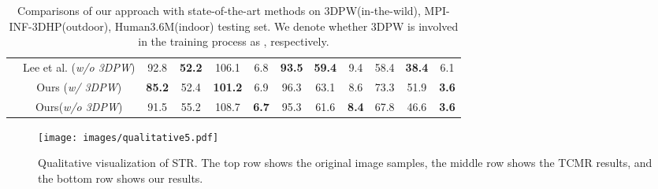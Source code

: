 \documentclass{bmvc2k}
\begin{document}
\begin{table*}[htb]
{\begin{tabular}{cc|cccc|ccc|ccc}
\cmidrule{2-12}          &Lee et al.  (\emph{w/o 3DPW}) \cite{Lee2021UncertaintyAwareHM}   &92.8       & \bfseries52.2      & 106.1      &6.8      &\bfseries93.5       &\bfseries59.4      & 9.4     &58.4     &\bfseries38.4      &6.1 \\

\cmidrule{2-12}          &Ours  (\emph{w/ 3DPW})    &\bfseries85.2       & 52.4      & \bfseries101.2      &6.9      &96.3       &63.1       & 8.6     &73.3     &51.9      &\bfseries3.6 \\

\cmidrule{2-12}          & Ours(\emph{w/o 3DPW})     & 91.5      & 55.2      & 108.7      & \bfseries6.7      & 95.3      & 61.6      & \bfseries8.4      & 67.8      & 46.6      & \bfseries3.6 \\
    \bottomrule
    \end{tabular}} 
    \caption{Comparisons of our approach with state-of-the-art methods on 3DPW(in-the-wild), MPI-INF-3DHP(outdoor), Human3.6M(indoor) testing set. We denote whether 3DPW is involved in the training process as ,  respectively.}  \label{tab:tab1}
\end{table*}\begin{figure*}[ht]
\centering
\texttt{[image: images/qualitative5.pdf]}
\caption{Qualitative visualization of STR. The top row shows the original image samples, the middle row shows the TCMR \cite{choi2021beyond} results, and the bottom row shows our results.} \label{fig:fig4}
  
\label{fig8}
\end{figure*}
\end{document}
